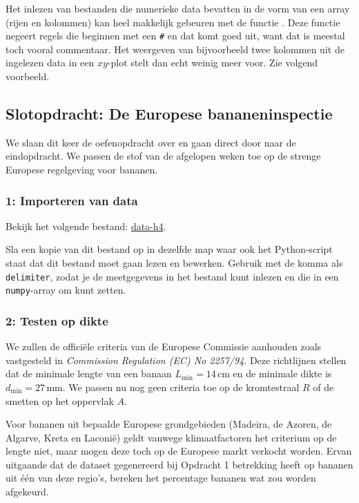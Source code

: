 \documentclass[a4paper,11pt, fleqn]{article}
\begin{document}
Het inlezen van bestanden die numerieke data bevatten in de vorm van een array (rijen en kolommen) kan heel makkelijk gebeuren met de  functie . Deze functie negeert regels die beginnen met een \verb,#, en dat komt goed uit, want dat is meestal toch vooral commentaar. Het weergeven van bijvoorbeeld twee kolommen uit de ingelezen data in een $xy$-plot stelt dan echt weinig meer voor. Zie volgend voorbeeld.
 

\subsection{Slotopdracht: De Europese bananeninspectie}
We slaan dit keer de oefenopdracht over en gaan direct door naar de eindopdracht. We passen de stof van de afgelopen weken toe op de strenge Europese regelgeving voor bananen.

\subsubsection*{1: Importeren van data}
Bekijk het volgende bestand: 
\href{https://github.com/Ichthus-College-IN/Python-x-Meet-je-leefomgeving/tree/main/inc/data_h4.txt}{data-h4}.

Sla een kopie van dit bestand op in dezelfde map waar ook het Python-script staat dat dit bestand moet gaan lezen en bewerken.
Gebruik  met de komma als \verb,delimiter,, zodat je de meetgegevens in het bestand kunt inlezen en die in een \verb,numpy,-array om kunt zetten.

\subsubsection*{2: Testen op dikte}
We zullen de offici\"ele criteria van de Europese Commissie aanhouden zoals vastgesteld in \emph{Commission Regulation (EC) No 2257/94}. Deze richtlijnen stellen dat de minimale lengte van een banaan $L_\textrm{min} = 14\,\textrm{cm}$ en de minimale dikte is $d_\textrm{min} = 27\,\textrm{mm}$. We passen nu nog geen criteria toe op de kromtestraal $R$ of de smetten op het oppervlak $A$.

Voor bananen uit bepaalde Europese grondgebieden (Madeira, de Azoren, de Algarve, Kreta en Laconi\"e) geldt vanwege klimaatfactoren het criterium op de lengte niet, maar mogen deze toch op de Europese markt verkocht worden. Ervan uitgaande dat de dataset gegenereerd bij Opdracht 1 betrekking heeft op bananen uit \'e\'en van deze regio's, bereken het percentage bananen wat zou worden afgekeurd.
\end{document}
